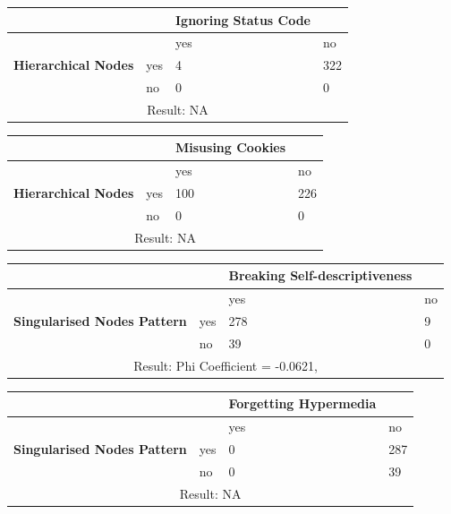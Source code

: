 \documentclass[a4paper,12pt]{article}
\begin{document}
\begin{center}
  \begin{tabular}{| p{60mm} | p{10mm} | p{35mm} | p{35mm} |}
  \hline
   & & \textbf{Ignoring Status Code} &
  \\
  \hline
  & & yes & no
  \\
  \hline
  \textbf{Hierarchical Nodes} & yes & 4 & 322
  \\
  \hline
   & no & 0 & 0
  \\
  \hline
  \multicolumn{4}{|c|}{Result: NA}
  \\ \hline
  \end{tabular}
  \end{center}

\begin{center}
  \begin{tabular}{| p{60mm} | p{10mm} | p{35mm} | p{35mm} |}
  \hline
   & & \textbf{Misusing Cookies} &
  \\
  \hline
  & & yes & no
  \\
  \hline
  \textbf{Hierarchical Nodes} & yes & 100 & 226
  \\
  \hline
   & no & 0 & 0
  \\
  \hline
  \multicolumn{4}{|c|}{Result: NA}
  \\ \hline
  \end{tabular}
  \end{center}

\begin{center}
  \begin{tabular}{| p{60mm} | p{10mm} | p{35mm} | p{35mm} |}
  \hline
   & & \textbf{Breaking Self-descriptiveness} &
  \\
  \hline
  & & yes & no
  \\
  \hline
  \textbf{Singularised Nodes Pattern} & yes & 278 & 9
  \\
  \hline
   & no & 39 & 0
  \\
  \hline
  \multicolumn{4}{|c|}{Result: Phi Coefficient = -0.0621, }
  \\ \hline
  \end{tabular}
  \end{center}

\begin{center}
  \begin{tabular}{| p{60mm} | p{10mm} | p{35mm} | p{35mm} |}
  \hline
   & & \textbf{Forgetting Hypermedia} &
  \\
  \hline
  & & yes & no
  \\
  \hline
  \textbf{Singularised Nodes Pattern} & yes & 0 & 287
  \\
  \hline
   & no & 0 & 39
  \\
  \hline
  \multicolumn{4}{|c|}{Result: NA}
  \\ \hline
  \end{tabular}
  \end{center}
\end{document}
